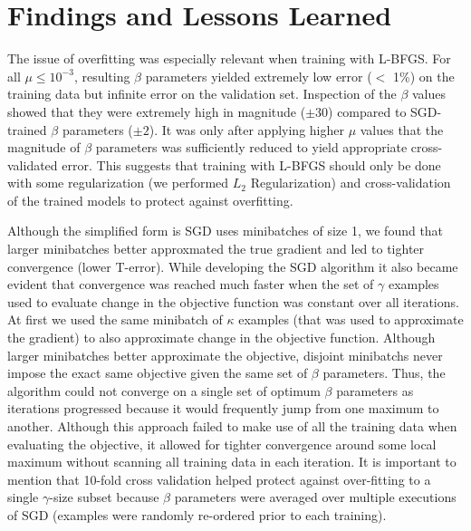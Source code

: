 \documentclass[10pt]{article}
\begin{document}
\section{Findings and Lessons Learned}
\label{sec:conclusion}

The issue of overfitting was especially relevant when training with L-BFGS. For all $\mu \leq 10^{-3}$, resulting $\beta$ parameters yielded extremely low error ($<$ 1\%) on the training data but infinite error on the validation set. Inspection of the $\beta$ values showed that they were extremely high in magnitude ($\pm 30$) compared to SGD-trained $\beta$ parameters ($\pm 2$). It was only after applying higher $\mu$ values that the magnitude of $\beta$ parameters was sufficiently reduced to yield appropriate cross-validated error. This suggests that training with L-BFGS should only be done with some regularization (we performed $L_2$ Regularization) and cross-validation of the trained models to protect against overfitting.

Although the simplified form is SGD uses minibatches of size 1, we found that larger minibatches better approxmated the true gradient and led to tighter convergence (lower T-error). While developing the SGD algorithm it also became evident that convergence was reached much faster when the set of $\gamma$ examples used to evaluate change in the objective function was constant over all iterations. At first we used the same minibatch of $\kappa$ examples (that was used to approximate the gradient) to also approximate change in the objective function. Although larger minibatches better approximate the objective, disjoint minibatchs never impose the exact same objective given the same set of $\beta$ parameters. Thus, the algorithm could not converge on a single set of optimum $\beta$ parameters as iterations progressed because it would frequently jump from one maximum to another. Although this approach failed to make use of all the training data when evaluating the objective, it allowed for tighter convergence around some local maximum without scanning all training data in each iteration. It is important to mention that 10-fold cross validation helped protect against over-fitting to a single $\gamma$-size subset because $\beta$ parameters were averaged over multiple executions of SGD (examples were randomly re-ordered prior to each training).





\end{document}
